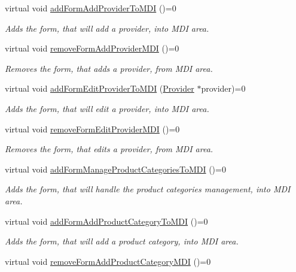 \begin{DoxyCompactItemize}
virtual void \hyperlink{class_i_main_window_abdede6a729dd8826634ad88cd1bfab44}{add\-Form\-Add\-Provider\-To\-M\-D\-I} ()=0
\begin{DoxyCompactList}\small\item\em \-Adds the form, that will add a provider, into \-M\-D\-I area. \end{DoxyCompactList}\item 
virtual void \hyperlink{class_i_main_window_addbff5d30645c13e3ede7ca872bc197e}{remove\-Form\-Add\-Provider\-M\-D\-I} ()=0
\begin{DoxyCompactList}\small\item\em \-Removes the form, that adds a provider, from \-M\-D\-I area. \end{DoxyCompactList}\item 
virtual void \hyperlink{class_i_main_window_a9275b1a3b1cb7511ad4b80912eb2af6f}{add\-Form\-Edit\-Provider\-To\-M\-D\-I} (\hyperlink{class_provider}{\-Provider} $\ast$provider)=0
\begin{DoxyCompactList}\small\item\em \-Adds the form, that will edit a provider, into \-M\-D\-I area. \end{DoxyCompactList}\item 
virtual void \hyperlink{class_i_main_window_ae4bc2b8e66c6c90efc9437bbe44ef7b7}{remove\-Form\-Edit\-Provider\-M\-D\-I} ()=0
\begin{DoxyCompactList}\small\item\em \-Removes the form, that edits a provider, from \-M\-D\-I area. \end{DoxyCompactList}\item 
virtual void \hyperlink{class_i_main_window_afc72f6b8ec3daf845792b04ad8e325a6}{add\-Form\-Manage\-Product\-Categories\-To\-M\-D\-I} ()=0
\begin{DoxyCompactList}\small\item\em \-Adds the form, that will handle the product categories management, into \-M\-D\-I area. \end{DoxyCompactList}\item 
virtual void \hyperlink{class_i_main_window_a51da70cd0ebe5b880ee44749d5d1f6a5}{add\-Form\-Add\-Product\-Category\-To\-M\-D\-I} ()=0
\begin{DoxyCompactList}\small\item\em \-Adds the form, that will add a product category, into \-M\-D\-I area. \end{DoxyCompactList}\item 
virtual void \hyperlink{class_i_main_window_a6aa82966df6d492ae833b187f1ed0ccd}{remove\-Form\-Add\-Product\-Category\-M\-D\-I} ()=0

\end{DoxyCompactItemize}
